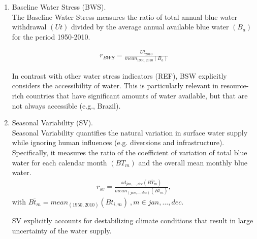 \documentclass[a4paper]{article}
\begin{document}
\begin{enumerate}
	\item Baseline Water Stress (BWS).\\
The Baseline Water Stress measures the ratio of total annual blue water withdrawal $(Ut)$ divided by the average annual available blue water $(B_a)$ for the period 1950-2010. 

\begin{align}
r_{BWS}=\frac{Ut_{2010}}{\mathit{mean}_{1950,2010}(B_a)}
\end{align}

In contrast with other water stress indicators (REF), BSW explicitly considers the accessibility of water. This is particularly relevant in resource-rich countries that have significant amounts of water available, but that are not always accessible (e.g., Brazil). 

	\item Seasonal Variability (SV).\\
Seasonal Variability quantifies the natural variation in surface water supply while ignoring human influences (e.g. diversions and infrastructure). 
Specifically, it measures the ratio of the coefficient of variation of total blue water for each calendar month $(BT_m)$ and the overall mean monthly blue water. 
\begin{align}
r_{sv}=\frac{\mathit{sd}_{jan,\dots,dec}(\bar{BT_m})}{\mathit{mean}_{(jan,\dots,dec)}(\bar{Bt_m})},
\end{align}
with $\bar{Bt_m}=\mathit{mean}_{(1950,2010)}	(Bt_{i,m})\:, m \in{jan,\dots,dec}.$

SV explicitly accounts for destabilizing climate conditions that result in large uncertainty of the water supply. 


\end{enumerate}
\end{document}
